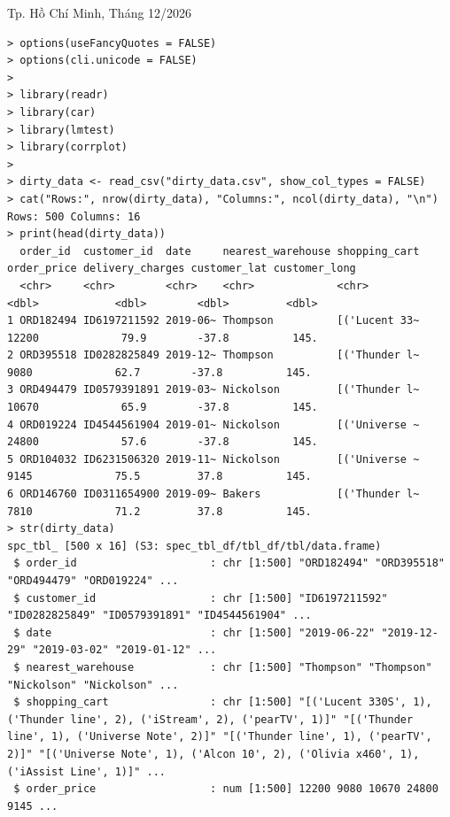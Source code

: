 \documentclass[12pt, a4paper]{article}
\begin{document}
	\vfill
	\begin{center}
		{\footnotesize Tp. Hồ Chí Minh, Tháng 12/2026}
	\end{center}
	\vspace{1cm}
	\pagebreak



\newpage
\begin{lstlisting}
> options(useFancyQuotes = FALSE)
> options(cli.unicode = FALSE)
> 
> library(readr)
> library(car)
> library(lmtest)
> library(corrplot)
> 
> dirty_data <- read_csv("dirty_data.csv", show_col_types = FALSE)
> cat("Rows:", nrow(dirty_data), "Columns:", ncol(dirty_data), "\n")                                                     
Rows: 500 Columns: 16 
> print(head(dirty_data))
  order_id  customer_id  date     nearest_warehouse shopping_cart order_price delivery_charges customer_lat customer_long
  <chr>     <chr>        <chr>    <chr>             <chr>               <dbl>            <dbl>        <dbl>         <dbl>
1 ORD182494 ID6197211592 2019-06~ Thompson          [('Lucent 33~       12200             79.9        -37.8          145.
2 ORD395518 ID0282825849 2019-12~ Thompson          [('Thunder l~        9080             62.7        -37.8          145.
3 ORD494479 ID0579391891 2019-03~ Nickolson         [('Thunder l~       10670             65.9        -37.8          145.
4 ORD019224 ID4544561904 2019-01~ Nickolson         [('Universe ~       24800             57.6        -37.8          145.
5 ORD104032 ID6231506320 2019-11~ Nickolson         [('Universe ~        9145             75.5         37.8          145.
6 ORD146760 ID0311654900 2019-09~ Bakers            [('Thunder l~        7810             71.2         37.8          145.
> str(dirty_data)
spc_tbl_ [500 x 16] (S3: spec_tbl_df/tbl_df/tbl/data.frame)
 $ order_id                     : chr [1:500] "ORD182494" "ORD395518" "ORD494479" "ORD019224" ...
 $ customer_id                  : chr [1:500] "ID6197211592" "ID0282825849" "ID0579391891" "ID4544561904" ...
 $ date                         : chr [1:500] "2019-06-22" "2019-12-29" "2019-03-02" "2019-01-12" ...
 $ nearest_warehouse            : chr [1:500] "Thompson" "Thompson" "Nickolson" "Nickolson" ...
 $ shopping_cart                : chr [1:500] "[('Lucent 330S', 1), ('Thunder line', 2), ('iStream', 2), ('pearTV', 1)]" "[('Thunder line', 1), ('Universe Note', 2)]" "[('Thunder line', 1), ('pearTV', 2)]" "[('Universe Note', 1), ('Alcon 10', 2), ('Olivia x460', 1), ('iAssist Line', 1)]" ...
 $ order_price                  : num [1:500] 12200 9080 10670 24800 9145 ...

\end{lstlisting}
\end{document}
